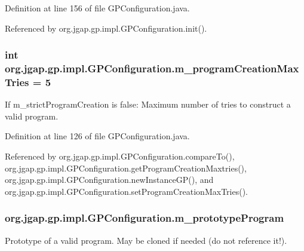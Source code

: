 Definition at line 156 of file G\-P\-Configuration.\-java.



Referenced by org.\-jgap.\-gp.\-impl.\-G\-P\-Configuration.\-init().

\hypertarget{classorg_1_1jgap_1_1gp_1_1impl_1_1_g_p_configuration_abe0c736b193ed2a23e8cc229c0686cf7}{
\subsubsection[{m\-\_\-program\-Creation\-Max\-Tries}]{\setlength{\rightskip}{0pt plus 5cm}int org.\-jgap.\-gp.\-impl.\-G\-P\-Configuration.\-m\-\_\-program\-Creation\-Max\-Tries = 5\hspace{0.3cm}{\ttfamily [private]}}}\label{classorg_1_1jgap_1_1gp_1_1impl_1_1_g_p_configuration_abe0c736b193ed2a23e8cc229c0686cf7}
If m\-\_\-strict\-Program\-Creation is false\-: Maximum number of tries to construct a valid program. 

Definition at line 126 of file G\-P\-Configuration.\-java.



Referenced by org.\-jgap.\-gp.\-impl.\-G\-P\-Configuration.\-compare\-To(), org.\-jgap.\-gp.\-impl.\-G\-P\-Configuration.\-get\-Program\-Creation\-Maxtries(), org.\-jgap.\-gp.\-impl.\-G\-P\-Configuration.\-new\-Instance\-G\-P(), and org.\-jgap.\-gp.\-impl.\-G\-P\-Configuration.\-set\-Program\-Creation\-Max\-Tries().

\hypertarget{classorg_1_1jgap_1_1gp_1_1impl_1_1_g_p_configuration_afebbac581a837fb7a7d91dd407f1be9c}{
\subsubsection[{m\-\_\-prototype\-Program}]{ org.\-jgap.\-gp.\-impl.\-G\-P\-Configuration.\-m\-\_\-prototype\-Program\hspace{0.3cm}{\ttfamily [private]}}}\label{classorg_1_1jgap_1_1gp_1_1impl_1_1_g_p_configuration_afebbac581a837fb7a7d91dd407f1be9c}
Prototype of a valid program. May be cloned if needed (do not reference it!).

